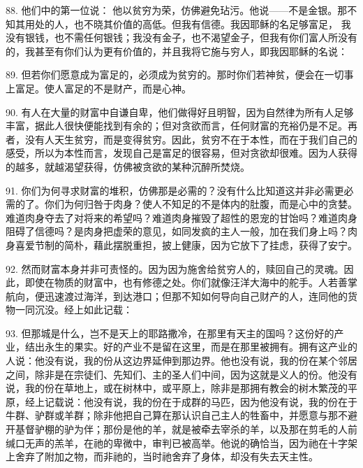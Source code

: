 88. 他们中的第一位说： 他以贫穷为荣，仿佛避免玷污。他说——不是金银。那不知其用处的人，也不晓其价值的高低。但我有信德。我因耶稣的名足够富足， 我没有银钱，也不需任何银钱；我没有金子，也不渴望金子，但我有你们富人所没有的，我甚至有你们认为更有价值的，并且我将它施与穷人，即我因耶稣的名说：\par

89. 但若你们愿意成为富足的，必须成为贫穷的。那时你们若神贫，便会在一切事上富足。使人富足的不是财产，而是心神。\par

90. 有人在大量的财富中自谦自卑，他们做得好且明智，因为自然律为所有人足够丰富，据此人很快便能找到有余的；但对贪欲而言，任何财富的充裕仍是不足。再者，没有人天生贫穷，而是变得贫穷。因此，贫穷不在于本性，而在于我们自己的感受，所以为本性而言，发现自己是富足的很容易，但对贪欲却很难。因为人获得的越多，就越渴望获得，仿佛被贪欲的某种沉醉所焚烧。\par

91. 你们为何寻求财富的堆积，仿佛那是必需的？没有什么比知道这并非必需更必需的了。你们为何归咎于肉身？使人不知足的不是体内的肚腹，而是心中的贪婪。难道肉身夺去了对将来的希望吗？难道肉身摧毁了超性的恩宠的甘饴吗？难道肉身阻碍了信德吗？是肉身把虚荣的意见，如同发疯的主人一般，加在我们身上吗？肉身喜爱节制的简朴，藉此摆脱重担，披上健康，因为它放下了挂虑，获得了安宁。\par

92. 然而财富本身并非可责怪的。因为因为施舍给贫穷人的，赎回自己的灵魂。因此，即使在物质的财富中，也有修德之处。你们就像汪洋大海中的舵手。人若善掌航向，便迅速渡过海洋，到达港口；但那不知如何导向自己财产的人，连同他的货物一同沉没。经上如此记载：\par

93. 但那城是什么，岂不是天上的耶路撒冷，在那里有天主的国吗？这份好的产业，结出永生的果实。好的产业不是留在这里，而是在那里被拥有。拥有这产业的人说：他没有说，我的份从这边界延伸到那边界。他也没有说，我的份在某个邻居之间，除非是在宗徒们、先知们、主的圣人们中间，因为这就是义人的份。他没有说，我的份在草地上，或在树林中，或平原上，除非是那拥有教会的树木繁茂的平原，经上记载说：他没有说，我的份在于成群的马匹，因为他没有说，我的份在于牛群、驴群或羊群；除非他把自己算在那认识自己主人的牲畜中，并愿意与那不避开基督驴棚的驴为伴；那份是他的羊，就是被牵去宰杀的羊，以及那在剪毛的人前缄口无声的羔羊，在祂的卑微中，审判已被高举。他说的确恰当，因为祂在十字架上舍弃了附加之物，而非祂的，当时祂舍弃了身体，却没有失去天主性。\par

